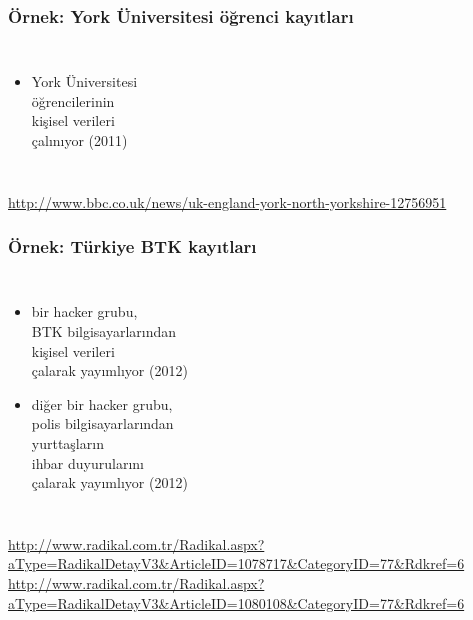 \documentclass[dvipsnames]{beamer}
\theoremstyle{definition}
\theoremstyle{example}
\theoremstyle{plain}
\begin{document}
\begin{frame}
  \frametitle{Örnek: York Üniversitesi öğrenci kayıtları}

  \begin{columns}

    \begin{itemize}
      \item York Üniversitesi\\
        öğrencilerinin\\
        kişisel verileri\\
        çalınıyor (2011)
    \end{itemize}
  \end{columns}

  \medskip
  \tiny{\url{http://www.bbc.co.uk/news/uk-england-york-north-yorkshire-12756951}}\\
\end{frame}

\begin{frame}
  \frametitle{Örnek: Türkiye BTK kayıtları}

  \begin{columns}

    \begin{itemize}
      \item bir hacker grubu,\\
        BTK bilgisayarlarından\\
        kişisel verileri\\
        çalarak yayımlıyor (2012)
      \item diğer bir hacker grubu,\\
        polis bilgisayarlarından\\
        yurttaşların\\
        ihbar duyurularını\\
        çalarak yayımlıyor (2012)
    \end{itemize}
  \end{columns}

  \medskip
  \tiny{\url{http://www.radikal.com.tr/Radikal.aspx?aType=RadikalDetayV3&ArticleID=1078717&CategoryID=77&Rdkref=6}}\\
  \tiny{\url{http://www.radikal.com.tr/Radikal.aspx?aType=RadikalDetayV3&ArticleID=1080108&CategoryID=77&Rdkref=6}}\\
\end{frame}
\end{document}
